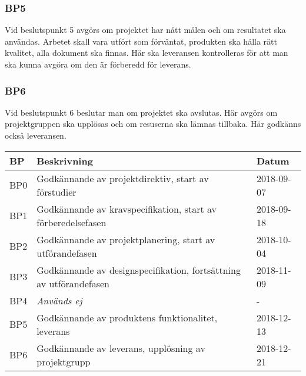 \documentclass[projektplan/plan.tex]{subfiles}
\begin{document}
\subsubsection*{BP5}
Vid beslutspunkt 5 avgörs om projektet har nått målen och om resultatet ska
användas. Arbetet skall vara utfört som förväntat, produkten ska hålla rätt
kvalitet, alla dokument ska finnas. Här ska leveransen kontrolleras för att man
ska kunna avgöra om den är förberedd för leverans.

\subsubsection*{BP6}
Vid beslutspunkt 6 beslutar man om projektet ska avslutas. Här avgörs om
projektgruppen ska upplösas och om resuserna ska lämnas tillbaka. Här godkänns
också leveransen.

{\renewcommand{\arraystretch}{1.6}
\begin{longtable}{p{8mm}p{123mm}p{20mm}}
    \bfseries BP &
    \bfseries Beskrivning &
    \bfseries Datum \\\hline\endhead
    BP0 & Godkännande av projektdirektiv, start av förstudier & 2018-09-07 \\
    BP1 & Godkännande av kravspecifikation, start av förberedelsefasen &
    2018-09-18 \\
    BP2 & Godkännande av projektplanering, start av utförandefasen & 2018-10-04
    \\
    BP3 & Godkännande av designspecifikation, fortsättning av utförandefasen &
    2018-11-09 \\
    BP4 & \emph{Används ej} & -\\
    BP5 & Godkännande av produktens funktionalitet, leverans & 2018-12-13 \\
    BP6 & Godkännande av leverans, upplösning av projektgrupp & 2018-12-21 \\
\end{longtable}}

\newpage
\end{document}
